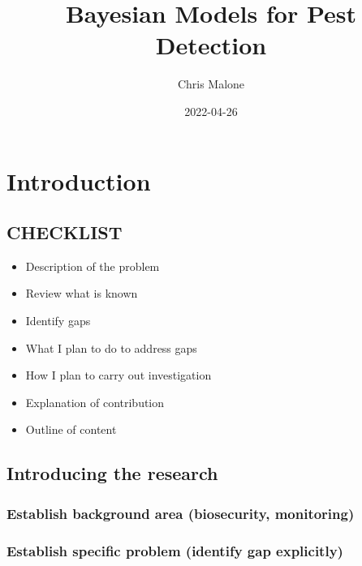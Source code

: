 \documentclass[
]{book}
\title{Bayesian Models for Pest Detection}
\author{Chris Malone}
\date{2022-04-26}
\providecommand{\tightlist}{%
  \setlength{\itemsep}{0pt}\setlength{\parskip}{0pt}}
\begin{document}
\maketitle

\renewcommand{\baselinestretch}{1}\normalsize
\tableofcontents
\renewcommand{\baselinestretch}{2}\normalsize

\hypertarget{introduction}{%
\chapter{Introduction}\label{introduction}}

\hypertarget{checklist}{%
\section{CHECKLIST}\label{checklist}}

\begin{itemize}
\tightlist
\item
  Description of the problem
\item
  Review what is known
\item
  Identify gaps
\item
  What I plan to do to address gaps
\item
  How I plan to carry out investigation
\item
  Explanation of contribution
\item
  Outline of content
\end{itemize}

\hypertarget{introducing-the-research}{%
\section{Introducing the research}\label{introducing-the-research}}

\hypertarget{establish-background-area-biosecurity-monitoring}{%
\subsection{Establish background area (biosecurity, monitoring)}\label{establish-background-area-biosecurity-monitoring}}

\hypertarget{establish-specific-problem-identify-gap-explicitly}{%
\subsection{Establish specific problem (identify gap explicitly)}\label{establish-specific-problem-identify-gap-explicitly}}
\end{document}
